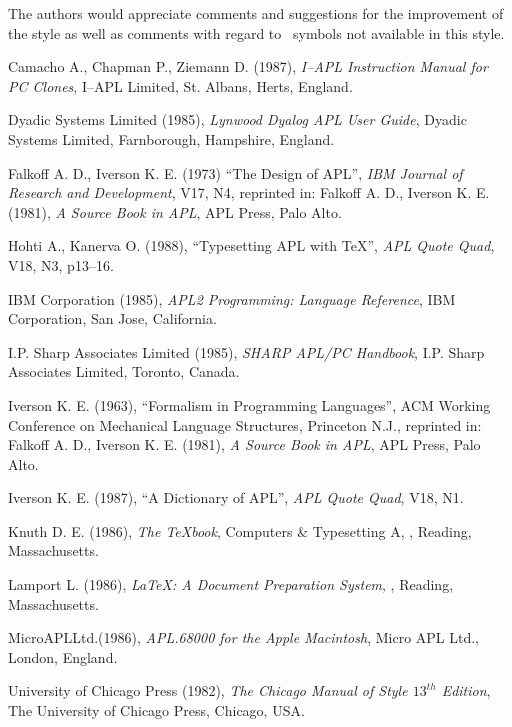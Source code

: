 The authors would appreciate
comments and suggestions for the improvement of the style
as well as comments with regard to \APL\ symbols not available
in this style. 
 
%
 
\begin{thebibliography}{99}
 
        Camacho A., Chapman P., Ziemann D. (1987),
        {\em I--APL Instruction Manual for PC Clones},
        I--APL Limited, St. Albans, Herts, England.
 
 Dyadic Systems Limited (1985),
        {\em Lynwood Dyalog APL User Guide},
        Dyadic Systems Limited, Farnborough, Hampshire, England.
 
 Falkoff A. D., Iverson K. E. (1973)
        ``The Design of APL'', {\em IBM Journal of Research and
        Development}, V17, N4,
        reprinted in: Falkoff A. D., Iverson K. E. (1981),
        {\em A Source Book in APL}, APL Press, Palo Alto.
 
 Hohti A., Kanerva O. (1988),
        ``Typesetting APL with \TeX'',
        {\em APL Quote Quad}, V18, N3, p13--16.
 
 IBM Corporation (1985),
        {\em APL2 Programming: Language Reference},
        IBM Corporation, San Jose, California.
 
 I.P. Sharp Associates Limited (1985),
        {\em SHARP APL/PC Handbook},
        I.P. Sharp Associates Limited, Toronto, Canada.
 
 Iverson K. E. (1963), ``Formalism in
        Programming Languages'', ACM Working Conference on
        Mechanical Language Structures, Princeton N.J.,
        reprinted in: Falkoff A. D., Iverson K. E. (1981),
        {\em A Source Book in APL}, APL Press, Palo Alto.
 
 Iverson K. E. (1987),
        ``A Dictionary of APL'', {\em APL Quote Quad}, V18, N1.
 
 Knuth D. E. (1986),
        {\em The \TeX book}, Computers \& Typesetting A,
        \AW, Reading, Massachusetts.
 
 Lamport L. (1986),
        {\em \LaTeX : A Document Preparation System},
        \AW, Reading, Massachusetts.
 
	\hfill Micro\hfill  APL\hfill  Ltd.\hfill  (1986),\break
        {\em APL.68000 for the Apple Macintosh},
        Micro APL Ltd., London, England.
 
        University of Chicago Press (1982),
        {\em The Chicago Manual of Style $13^{th}$ Edition},
        The University of Chicago Press, Chicago, USA.
 
\end{thebibliography}
 
